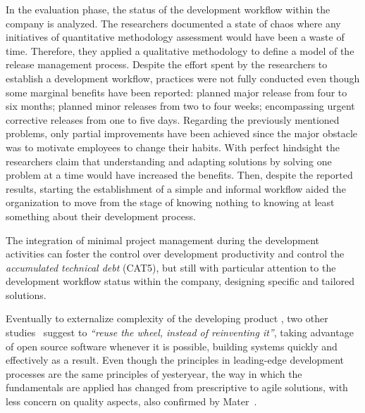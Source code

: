 \documentclass[10pt,journal,letterpaper,compsoc]{IEEEtran}
\begin{document}
In the evaluation phase, the status of the development workflow
within the company is analyzed. The researchers documented a state of chaos
where any initiatives of quantitative methodology assessment would have been a
waste of time. Therefore, they applied a qualitative methodology to define a
model of the release management process. 
Despite the effort spent by the researchers to establish a development workflow, 
practices were not fully conducted even though some marginal benefits have been 
reported: planned major release from four to six months; planned minor releases 
from two to four weeks; encompassing urgent corrective releases from one to five 
days. 
Regarding the previously mentioned problems, only partial improvements have 
been achieved since the major obstacle was to motivate employees to change 
their habits. With perfect hindsight the researchers claim that understanding 
and adapting solutions by solving one problem at a time would have increased 
the benefits. Then, despite the reported results, starting the establishment of 
a simple and informal workflow aided the organization to move from the stage of 
knowing nothing to knowing at least something about their development process.

The integration of minimal project management during the development activities
can foster the control over development productivity and control the
\textit{accumulated technical debt} (CAT5), but still with particular attention
to the development workflow status within the company, designing specific and
tailored solutions.

Eventually to externalize complexity of the developing product 
, two other studies~\cite{Wall2001, Bean2005} suggest to \textit{``reuse the 
wheel, instead of reinventing it''}, taking advantage of open source software 
whenever it is possible, building systems quickly and effectively as a result. 
Even though the principles in leading-edge development processes are the same
principles of yesteryear, the way in which the fundamentals are applied has
changed from prescriptive to agile solutions, with less concern on quality
aspects, also confirmed by Mater~\cite{Mater2000}.
\end{document}
